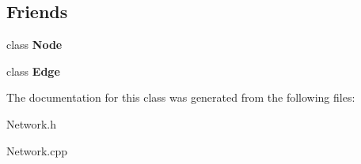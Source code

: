 \subsection*{Friends}
\begin{DoxyCompactItemize}
\item 
\hypertarget{classNetwork_a6db9d28bd448a131448276ee03de1e6d}{}class {\bfseries Node}\label{classNetwork_a6db9d28bd448a131448276ee03de1e6d}

\item 
\hypertarget{classNetwork_ad2c8ba04c9d9989ccbf3c5aba267a3d7}{}class {\bfseries Edge}\label{classNetwork_ad2c8ba04c9d9989ccbf3c5aba267a3d7}

\end{DoxyCompactItemize}


The documentation for this class was generated from the following files\+:\begin{DoxyCompactItemize}
\item 
Network.\+h\item 
Network.\+cpp\end{DoxyCompactItemize}
